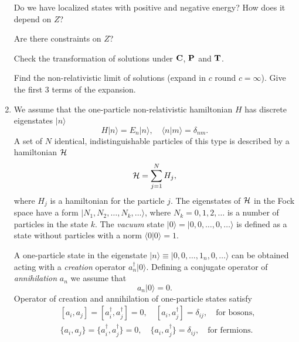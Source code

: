\documentclass[a4paper,11pt]{article}
\begin{document}
\begin{enumerate}
  Do we have localized states with positive and negative energy? How
  does it depend on $Z$?

  Are there constraints on $Z$?

  Check the transformation of solutions under $\mathbf{C}$, $\mathbf{P}$ and
  $\mathbf{T}$.

  Find the non-relativistic limit of solutions (expand in $c$ round
  $c = \infty$). Give the first 3 terms of the expansion.



\item We assume that the one-particle non-relativistic hamiltonian $H$
  has discrete eigenstates $| n \rangle$
  \begin{equation}
    \label{eq:1}
    H | n \rangle = E_{ n } | n \rangle, \quad
    \langle n | m \rangle = \delta_{ n m }.
  \end{equation}
  A set of $N$ identical, indistinguishable particles of this type is
  described by a hamiltonian $\mathcal{H}$
  \begin{equation}
    \label{eq:2}
    \mathcal{H} = \sum_{ j = 1 }^{ N } H_{ j },
  \end{equation}
  where $H_{ j }$ is a hamiltonian for the particle $j$. The
  eigenstates of $\mathcal{H}$ in the Fock space have a form
  $| N_{ 1 }, N_{ 2 }, \ldots, N_{ k }, \ldots \rangle$, where
  $N_{ k } = 0, 1, 2, \ldots$ is a number of particles in the state
  $k$. The \textit{vacuum} state
  $| 0 \rangle = | 0, 0, \ldots, 0, \ldots \rangle$ is defined as a state without particles
  with a norm $\langle 0 | 0 \rangle = 1$.

  A one-particle state in the eigenstate
  $| n \rangle \equiv | 0, 0, \ldots, 1_{ n }, 0, \ldots \rangle$ can be obtained acting
  with a \textit{creation} operator $a_{ n }^{ \dagger } | 0 \rangle$. Defining a
  conjugate operator of \textit{annihilation} $a_{ n }$ we assume that
  \begin{equation}
    \label{eq:3}
    a_{ n } | 0 \rangle = 0.
  \end{equation}
  Operator of creation and annihilation of one-particle states satisfy
  \begin{align}
    &[ a_{ i }, a_{ j } ] = [ a_{ i }^{ \dagger }, a_{ j }^{ \dagger } ] = 0, \quad
      [ a_{ i }, a_{ j }^{ \dagger } ] = \delta_{ i j }, \quad
      \textrm{for bosons}, \\
    &\{ a_{ i }, a_{ j } \} = \{ a_{ i }^{ \dagger }, a_{ j }^{ \dagger } \} = 0, \quad
      \{ a_{ i }, a_{ j }^{ \dagger } \} = \delta_{ i j }, \quad
      \textrm{for fermions}.
  \end{align}


\end{enumerate}
\end{document}
